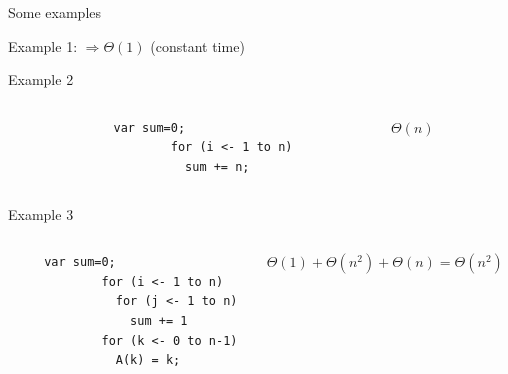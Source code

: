 \begin{frame}[fragile]{Some examples}
  \begin{block}{Example 1: {\color{black}\normalsize
       $\Rightarrow \Theta(1)$ (constant time)}}
  \end{block}\vspace{-\baselineskip}

  \begin{block}{Example 2}\vspace{-\baselineskip}
    \begin{columns}
      \begin{column}{.1\linewidth}~\end{column}
      \begin{column}{.3\linewidth}
        \begin{Verbatim}[gobble=8]
        var sum=0;
        for (i <- 1 to n)
          sum += n;
      \end{Verbatim}
      \end{column}
      \begin{column}{.3\linewidth}
        $\Theta(n)$
      \end{column}
    \end{columns}
  \end{block}

  \begin{block}{Example 3}\vspace{-\baselineskip}
    \begin{columns}
      \begin{column}{.1\linewidth}~\end{column}
      \begin{column}{.3\linewidth}
        \begin{Verbatim}[gobble=8]
        var sum=0;
        for (i <- 1 to n)
          for (j <- 1 to n)
            sum += 1
        for (k <- 0 to n-1)
          A(k) = k;
      \end{Verbatim}
      \end{column}
      \begin{column}{.3\linewidth}
        $\Theta(1)+\Theta(n^2)+\Theta(n)=\Theta(n^2)$
      \end{column}
    \end{columns}
  \end{block}


\end{frame}
